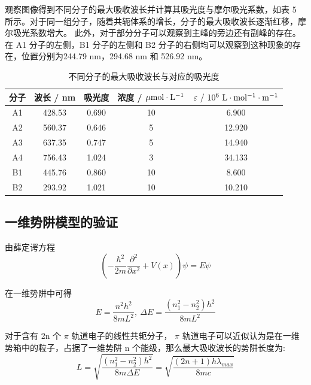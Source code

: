 \documentclass[cn,hazy,pku,12pt,normal,math=newtx,cite=super]{elegantnote}
\begin{document}
观察图像得到不同分子的最大吸收波长并计算其吸光度与摩尔吸光系数，如表 5 所示。对于同一组分子，随着共轭体系的增长，分子的最大吸收波长逐渐红移，摩尔吸光系数增大。
此外，对于部分分子可以观察到主峰的旁边还有副峰的存在。在 A1 分子的左侧，B1 分子的左侧和 B2 分子的右侧均可以观察到这种现象的存在，位置分别为244.79 nm，294.68 nm 和
526.92 nm。

\begin{table}[htbp]
    \centering
    \caption{不同分子的最大吸收波长与对应的吸光度}
    \label{15}
    \begin{tabular}{ccccc}
    \hline
    分子 & 波长 / nm  & 吸光度   & \multicolumn{1}{l}{浓度 / $ \mu {\rm mol \cdot  L^{-1}}$} & \multicolumn{1}{l}{$\varepsilon\ /\ {\rm 10^{6}\  L\cdot mol^{-1} \cdot m^{-1}  }$}       \\ \hline
    A1 & 428.53   & 0.690 & 10 & 6.900  \\
    A2 & 560.37   & 0.646 & 5  & 12.920 \\
    A3 & 637.35   & 0.747 & 5  & 14.940 \\
    A4 & 756.43   & 1.024 & 3  & 34.133 \\
    B1 & 445.76   & 0.860 & 10 & 8.600  \\
    B2 & 293.92   & 1.021 & 10 & 10.210 \\ \hline
    \end{tabular}
\end{table}

\subsection{一维势阱模型的验证}

由薛定谔方程
\begin{equation}
    \left(-\frac{\hbar^2}{2 m} \frac{\partial^2}{\partial x^2}+V(x)\right) \psi=E \psi
\end{equation}

在一维势阱中可得
\begin{equation}
    E=\frac{n^2h^2}{8mL^2} ,\  \Delta E=\frac{(n_1^2-n_2^2)h^2}{8mL^2}
\end{equation}

对于含有 2n 个 $\pi$ 轨道电子的线性共轭分子， $\pi$ 轨道电子可以近似认为是在一维势箱中的粒子，占据了一维势阱 n 个能级，那么最大吸收波长的势阱长度为:
\begin{equation}\label{l}
    L = \sqrt{\frac{(n_1^2-n_2^2)h^2}{8m\Delta E}} =  \sqrt{\frac{(2n + 1)h\lambda_{max}}{8mc}}
\end{equation}
\end{document}
